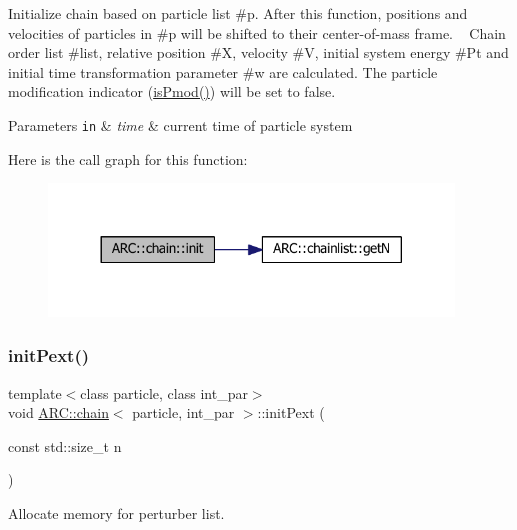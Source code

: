 Initialize chain based on particle list \#p. After this function, positions and velocities of particles in \#p will be shifted to their center-\/of-\/mass frame. ~\newline
 Chain order list \#list, relative position \#X, velocity \#V, initial system energy \#\+Pt and initial time transformation parameter \#w are calculated. The particle modification indicator (\hyperlink{classARC_1_1chain_a29ff9707fe94a554966c885d9bafa819}{is\+Pmod()}) will be set to false. 
\begin{DoxyParams}[1]{Parameters}
\mbox{\tt in}  & {\em time} & current time of particle system \\
\hline
\end{DoxyParams}
Here is the call graph for this function\+:
\nopagebreak
\begin{figure}[H]
\begin{center}
\leavevmode
\includegraphics[width=305pt]{classARC_1_1chain_a3fe37720ceb48c14905c92d3e25e71a4_cgraph}
\end{center}
\end{figure}
\hypertarget{classARC_1_1chain_a1c6de84a911feff1425dfb59e7a89087}{}\label{classARC_1_1chain_a1c6de84a911feff1425dfb59e7a89087} 
\subsubsection{\texorpdfstring{init\+Pext()}{initPext()}}
{\footnotesize\ttfamily template$<$class particle, class int\+\_\+par$>$ \\
void \hyperlink{classARC_1_1chain}{A\+R\+C\+::chain}$<$ particle, int\+\_\+par $>$\+::init\+Pext (\begin{DoxyParamCaption}\item[{const std\+::size\+\_\+t}]{n }\end{DoxyParamCaption})\hspace{0.3cm}{\ttfamily [inline]}}



Allocate memory for perturber list. 

